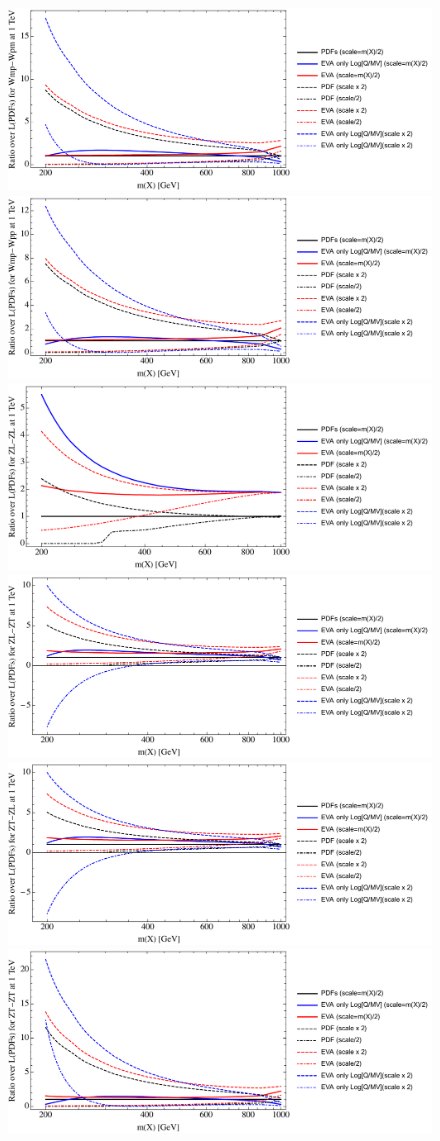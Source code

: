 \documentclass[a4paper,11pt]{article}
\begin{document}
\begin{figure}[ht]
\includegraphics[width=0.4\linewidth]{PlotLumi/1TeV/ratios/Wmp-Wpm.pdf}
\includegraphics[width=0.4\linewidth]{PlotLumi/1TeV/ratios/Wmp-Wpp.pdf}
\includegraphics[width=0.4\linewidth]{PlotLumi/1TeV/ratios/ZL-ZL.pdf}
\includegraphics[width=0.4\linewidth]{PlotLumi/1TeV/ratios/ZL-ZT.pdf}
\includegraphics[width=0.4\linewidth]{PlotLumi/1TeV/ratios/ZT-ZL.pdf}
\includegraphics[width=0.4\linewidth]{PlotLumi/1TeV/ratios/ZT-ZT.pdf}
\end{figure}
\end{document}
